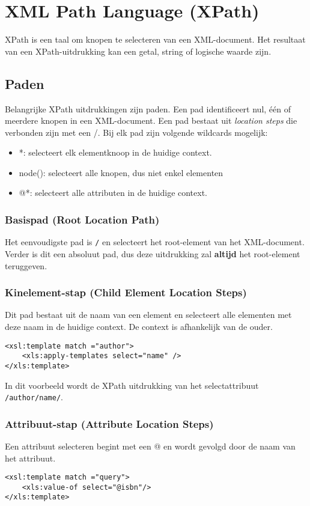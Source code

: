\documentclass{report}
\begin{document}
	\chapter{XML Path Language (XPath)}
	XPath is een taal om knopen te selecteren van een XML-document. Het resultaat van een XPath-uitdrukking kan een getal, string of logische waarde zijn.
	\section{Paden}
	Belangrijke XPath uitdrukkingen zijn paden. Een pad identificeert nul, één of meerdere knopen in een XML-document. Een pad bestaat uit \textit{location steps} die verbonden zijn met een /. Bij elk pad zijn volgende wildcards mogelijk:
	\begin{itemize}
		\item *: selecteert elk elementknoop in de huidige context.
		\item node(): selecteert alle knopen, dus niet enkel elementen
		\item @*: selecteert alle attributen in de huidige context.
	\end{itemize}
	\subsection{Basispad (Root Location Path)}
	
	Het eenvoudigste pad is \texttt{/} en selecteert het root-element van het XML-document. Verder is dit een absoluut pad, dus deze uitdrukking zal \textbf{altijd} het root-element teruggeven.
	\subsection{Kinelement-stap (Child Element Location Steps)}
	Dit pad bestaat uit de naam van een element en selecteert alle elementen met deze naam in de huidige context. De context is afhankelijk van de ouder. 
	
	\begin{lstlisting}
<xsl:template match ="author">
	<xls:apply-templates select="name" />
</xls:template>
	\end{lstlisting}
	In dit voorbeeld wordt de XPath uitdrukking van het selectattribuut \texttt{/author/name/}.
	
	\subsection{Attribuut-stap (Attribute Location Steps)}
	Een attribuut selecteren begint met een @ en wordt gevolgd door de naam van het attribuut.	
	\begin{lstlisting}
<xsl:template match ="query">
	<xls:value-of select="@isbn"/>
</xls:template>
	\end{lstlisting}
	
\end{document}
